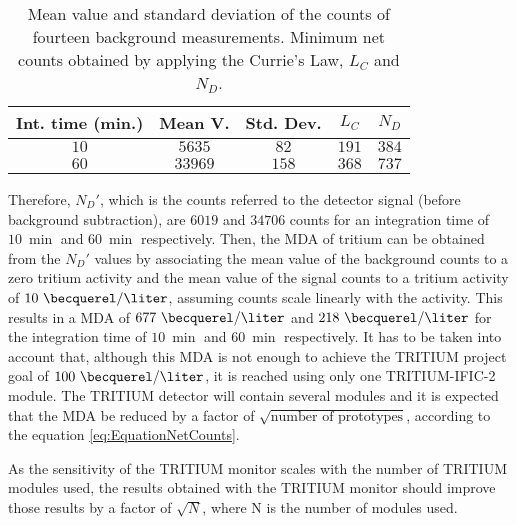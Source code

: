\begin{table}[htbp]
\centering{}%
\begin{tabular}{ccccc}
\toprule 
Int. time (min.) & Mean V. & Std. Dev. & $L_C$ & $N_D$ \tabularnewline
\midrule
\midrule 
$10$ & $5635$ & $82$ & $191$ & $384$ \tabularnewline
$60$ & $33969$ & $158$ & $368$ & $737$ \tabularnewline
\bottomrule
\end{tabular}
\caption{Mean value and standard deviation of the counts of fourteen background measurements. Minimum net counts obtained by applying the Currie's Law, $L_C$ and $N_D$.}
\label{tab:CurrieLawTRITIUMIFIC2}
\end{table}

Therefore, $N_D'$, which is the counts referred to the detector signal (before background subtraction), are $6019$ and $34706$ counts for an integration time of $10~\min$ and $60~\min$ respectively. Then, the MDA of tritium can be obtained from the $N_D'$ values by associating the mean value of the background counts to a zero tritium activity and the mean value of the signal counts to a tritium activity of $10~\becquerel/\liter$, assuming counts scale linearly with the activity. This results in a MDA of $677~\becquerel/\liter$ and $218~\becquerel/\liter$ for the integration time of $10~\min$ and $60~\min$ respectively. It has to be taken into account that, although this MDA is not enough to achieve the TRITIUM project goal of $100~\becquerel/\liter$, it is reached using only one TRITIUM-IFIC-2 module. The TRITIUM detector will contain several modules and it is expected that the MDA be reduced by a factor of $\sqrt{\text{number of prototypes}}$, according to the equation \ref{eq:EquationNetCounts}.



 As the sensitivity of the TRITIUM monitor scales with the number of TRITIUM modules used, the results obtained with the TRITIUM monitor should improve those results by a factor of $\sqrt{N}$, where N is the number of modules used.